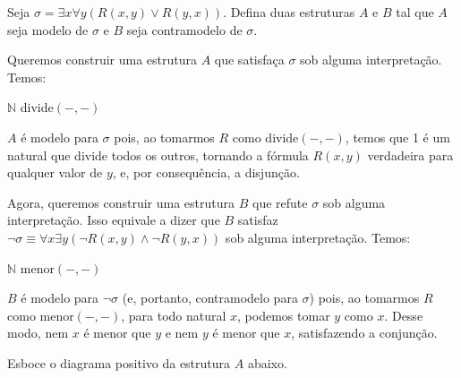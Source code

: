 \begin{rexercises}
    \begin{question}
        Seja $\sigma = \exists x \forall y(R(x,y) \lor R(y, x))$. Defina duas estruturas $A$ e $B$ tal que $A$ seja modelo de $\sigma$ e $B$ seja contramodelo de $\sigma$.
        \begin{resolution}
            Queremos construir uma estrutura $A$ que satisfaça $\sigma$ sob alguma interpretação. Temos:
            
            \begin{center}
                \begin{structure}
                    {$\mathbb{N}$}
                    {}
                    {divide$(-,-)$}
                    {}
                    {}
                    {}    
                \end{structure}
            \end{center}
           
            $A$ é modelo para $\sigma$ pois, ao tomarmos $R$ como divide$(-,-)$, temos que 1 é um natural que divide todos os outros, tornando a fórmula $R(x,y)$ verdadeira para qualquer valor de $y$, e, por consequência, a disjunção.

            Agora, queremos construir uma estrutura $B$ que refute $\sigma$ sob alguma interpretação. Isso equivale a dizer que $B$ satisfaz $\neg \sigma \equiv \forall x\exists y(\neg R(x, y) \land \neg R(y, x))$ sob alguma interpretação. Temos:

            \begin{center}
                \begin{structure}
                    {$\mathbb{N}$}
                    {}
                    {menor$(-,-)$}
                    {}
                    {}
                    {}    
                \end{structure}
            \end{center}

            $B$ é modelo para $\neg \sigma$ (e, portanto, contramodelo para $\sigma$) pois, ao tomarmos $R$ como menor$(-,-)$, para todo natural $x$, podemos tomar $y$ como $x$. Desse modo, nem $x$ é menor que $y$ e nem $y$ é menor que $x$, satisfazendo a conjunção.
        \end{resolution}
    \end{question}

    \begin{question}
        Esboce o diagrama positivo da estrutura $A$ abaixo.
        

\end{question}
\end{rexercises}
